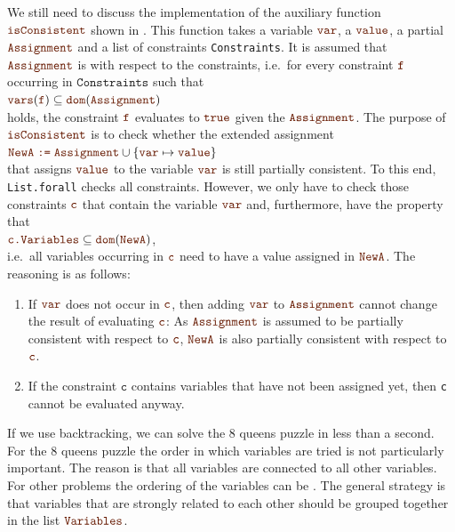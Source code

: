 We still need to discuss the implementation of the auxiliary function $\mytt{isConsistent}$
shown in .  This function takes a variable $\mytt{var}$, a $\mytt{value}$, a partial 
$\mytt{Assignment}$ and a list of constraints \texttt{Constraints}.  It is assumed that $\mytt{Assignment}$ is
 with respect to the constraints, i.e.~for every constraint $\mytt{f}$
occurring in $\mathtt{Constraints}$ such that
\\[0.2cm]
\hspace*{1.3cm}
$\mytt{vars}(\mytt{f}) \subseteq \mytt{dom}(\mytt{Assignment})$
\\[0.2cm]
holds, the constraint $\mytt{f}$ evaluates to $\mytt{true}$ given the $\mytt{Assignment}$.  The purpose of
$\mytt{isConsistent}$ is to check whether the extended assignment
\\[0.2cm]
\hspace*{1.3cm}
$\mytt{NewA} \;\mytt{:=}\;\mytt{Assignment} \cup \{ \mytt{var} \mapsto \mytt{value} \}$
\\[0.2cm]
that assigns $\mytt{value}$ to the variable $\mytt{var}$ is still partially consistent. 
To this end, \texttt{List.forall} checks all constraints. 
However, we only have to check those constraints $\mytt{c}$ that contain the variable $\mytt{var}$ and,
furthermore, have the property that
\\[0.2cm]
\hspace*{1.3cm}
$\mytt{c.Variables} \subseteq \mytt{dom}(\mytt{NewA})$,
\\[0.2cm]
i.e.~all variables occurring in $\mytt{c}$ need to have a value assigned in
$\mytt{NewA}$.  The reasoning is as follows:
\begin{enumerate}
\item If $\mytt{var}$ does not occur in $\mytt{c}$, then adding $\mytt{var}$ to
      $\mytt{Assignment}$ cannot change the result of evaluating $\mytt{c}$: As
      $\mytt{Assignment}$ is assumed to be partially consistent with respect to $\mytt{c}$, 
      $\mytt{NewA}$ is also partially consistent with respect to $\mytt{c}$.
\item If the constraint $\mathtt{c}$ contains variables that have not been assigned yet, then \texttt{c} cannot
      be evaluated anyway.
\end{enumerate}
If we use backtracking, we can solve the 8 queens puzzle in less than a second.
For the 8 queens puzzle the order in which variables are tried is not particularly important.  The reason
is that all variables are connected to all other variables.  For other problems the ordering of the variables
can be .  The general strategy is that variables that are strongly related to each other should
be grouped together in the list $\mytt{Variables}$.

